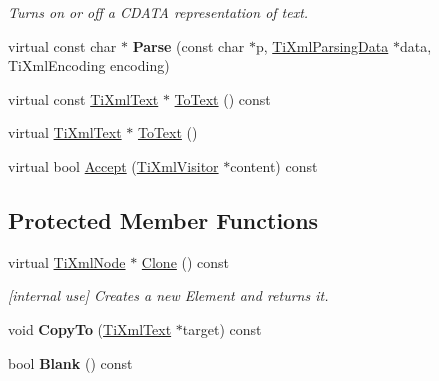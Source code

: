 \begin{DoxyCompactItemize}
\begin{DoxyCompactList}\small\item\em \-Turns on or off a \-C\-D\-A\-T\-A representation of text. \end{DoxyCompactList}\item 
\hypertarget{class_ti_xml_text_a8d2dcfa41fc73d3e62dacc2fcf633819}{
virtual const char $\ast$ {\bfseries \-Parse} (const char $\ast$p, \hyperlink{class_ti_xml_parsing_data}{\-Ti\-Xml\-Parsing\-Data} $\ast$data, \-Ti\-Xml\-Encoding encoding)}
\label{class_ti_xml_text_a8d2dcfa41fc73d3e62dacc2fcf633819}

\item 
virtual const \hyperlink{class_ti_xml_text}{\-Ti\-Xml\-Text} $\ast$ \hyperlink{class_ti_xml_text_a895bf34ffad17f7439ab2a52b9651648}{\-To\-Text} () const 
\item 
virtual \hyperlink{class_ti_xml_text}{\-Ti\-Xml\-Text} $\ast$ \hyperlink{class_ti_xml_text_ae7c3a8fd3e4dbf6c0c4363a943d72f5b}{\-To\-Text} ()
\item 
virtual bool \hyperlink{class_ti_xml_text_a43b9954ebf679557fac1a4453f337b7c}{\-Accept} (\hyperlink{class_ti_xml_visitor}{\-Ti\-Xml\-Visitor} $\ast$content) const 
\end{DoxyCompactItemize}
\subsection*{\-Protected \-Member \-Functions}
\begin{DoxyCompactItemize}
\item 
\hypertarget{class_ti_xml_text_adde1869dfb029be50713fbfd8ce4d21f}{
virtual \hyperlink{class_ti_xml_node}{\-Ti\-Xml\-Node} $\ast$ \hyperlink{class_ti_xml_text_adde1869dfb029be50713fbfd8ce4d21f}{\-Clone} () const }
\label{class_ti_xml_text_adde1869dfb029be50713fbfd8ce4d21f}

\begin{DoxyCompactList}\small\item\em \mbox{[}internal use\mbox{]} \-Creates a new \-Element and returns it. \end{DoxyCompactList}\item 
\hypertarget{class_ti_xml_text_adcec7d9b6fccfc5777452bb97e6031c1}{
void {\bfseries \-Copy\-To} (\hyperlink{class_ti_xml_text}{\-Ti\-Xml\-Text} $\ast$target) const }
\label{class_ti_xml_text_adcec7d9b6fccfc5777452bb97e6031c1}

\item 
\hypertarget{class_ti_xml_text_a1c120428e3b3cf24d79706e6d2b65aa6}{
bool {\bfseries \-Blank} () const }
\label{class_ti_xml_text_a1c120428e3b3cf24d79706e6d2b65aa6}

\end{DoxyCompactItemize}
